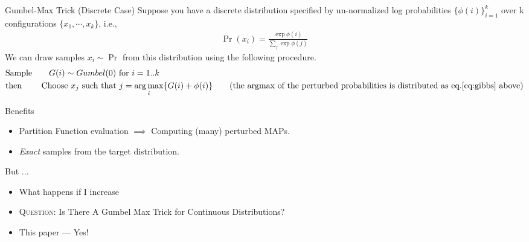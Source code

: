 
\begin{frame}{Gumbel-Max Trick (Discrete Case)}
  Suppose you have a discrete distribution specified by un-normalized log probabilities $\{\phi(i)\}_{i=1}^{k}$ over k configurations $\{x_1,\cdots,x_k\}$, i.e.,
  \begin{align}
    \Pr(x_i) = \frac{\exp\phi(i)}{\sum_j\exp\phi(j)} \label{eq:gibbs}
  \end{align}
  We can draw samples $x_i \sim \Pr$ from this distribution using the following procedure.
  \begin{align*}
    & \text{Sample} \qquad G(i) \sim Gumbel(0) \text{ for } i=1..k\\
    & \text{then} \qquad \text{ Choose } x_j \text{ such that } j= \argmax_i \{G(i) +\phi(i)\} \tag{the argmax of the perturbed probabilities is distributed as eq.\ref{eq:gibbs} above}
  \end{align*}

\end{frame}
\begin{frame}{Benefits} %
  \begin{itemize}
  \item Partition Function evaluation $\implies$ Computing (many) perturbed MAPs. %
  \item \emph{Exact} samples from the target distribution. %
  \end{itemize}
  But ...
  \begin{itemize}
  \item What happens if I increase 
  \item \textsc{Question:} Is There A Gumbel Max Trick for Continuous Distributions? %
    \pause
  \item {\color{red} This paper --- Yes!}
  \end{itemize}
\end{frame}

